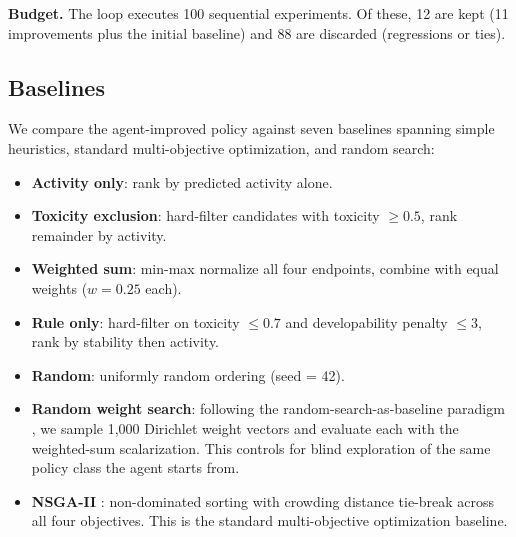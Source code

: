 \textbf{Budget.}
The loop executes 100 sequential experiments.
Of these, 12 are kept (11 improvements plus the initial baseline) and 88 are discarded (regressions or ties).

\subsection{Baselines}
\label{sec:baselines}

We compare the agent-improved policy against seven baselines spanning simple heuristics, standard multi-objective optimization, and random search:

\begin{itemize}[nosep]
  \item \textbf{Activity only}: rank by predicted activity alone.
  \item \textbf{Toxicity exclusion}: hard-filter candidates with toxicity $\geq 0.5$, rank remainder by activity.
  \item \textbf{Weighted sum}: min-max normalize all four endpoints, combine with equal weights ($w = 0.25$ each).
  \item \textbf{Rule only}: hard-filter on toxicity $\leq 0.7$ and developability penalty $\leq 3$, rank by stability then activity.
  \item \textbf{Random}: uniformly random ordering (seed = 42).
  \item \textbf{Random weight search}: following the random-search-as-baseline paradigm \citep{bergstra2012random}, we sample 1{,}000 Dirichlet weight vectors and evaluate each with the weighted-sum scalarization. This controls for blind exploration of the same policy class the agent starts from.
  \item \textbf{NSGA-II} \citep{deb2002nsga2}: non-dominated sorting with crowding distance tie-break across all four objectives. This is the standard multi-objective optimization baseline.
\end{itemize}
